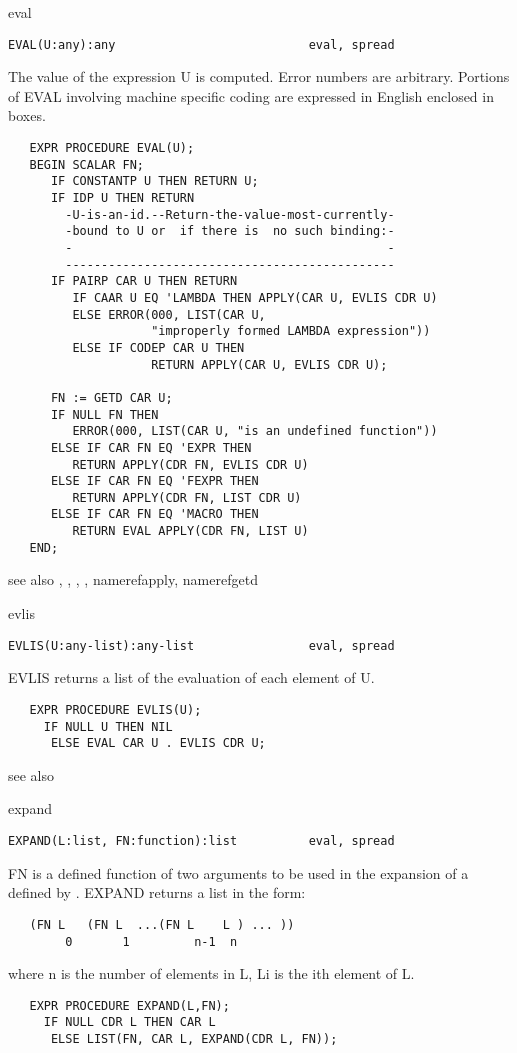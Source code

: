 \begin{Function}{eval}
\begin{verbatim}
EVAL(U:any):any                           eval, spread
\end{verbatim}
   The  value of  the expression  U is  computed.   Error numbers
   are  arbitrary.   Portions of EVAL  involving machine specific
   coding are expressed in English enclosed in boxes.
\begin{verbatim}
   EXPR PROCEDURE EVAL(U);
   BEGIN SCALAR FN;
      IF CONSTANTP U THEN RETURN U;
      IF IDP U THEN RETURN
        -U-is-an-id.--Return-the-value-most-currently-
        -bound to U or  if there is  no such binding:-
        -                                            -
        ----------------------------------------------
      IF PAIRP CAR U THEN RETURN
         IF CAAR U EQ 'LAMBDA THEN APPLY(CAR U, EVLIS CDR U)
         ELSE ERROR(000, LIST(CAR U,
                    "improperly formed LAMBDA expression"))
         ELSE IF CODEP CAR U THEN
                    RETURN APPLY(CAR U, EVLIS CDR U);

      FN := GETD CAR U;
      IF NULL FN THEN
         ERROR(000, LIST(CAR U, "is an undefined function"))
      ELSE IF CAR FN EQ 'EXPR THEN
         RETURN APPLY(CDR FN, EVLIS CDR U)
      ELSE IF CAR FN EQ 'FEXPR THEN
         RETURN APPLY(CDR FN, LIST CDR U)
      ELSE IF CAR FN EQ 'MACRO THEN
         RETURN EVAL APPLY(CDR FN, LIST U)
   END;
\end{verbatim}
see also , , ,
, nameref{apply}, nameref{getd}
\end{Function}
\begin{Function}{evlis}
\begin{verbatim}
EVLIS(U:any-list):any-list                eval, spread
\end{verbatim}
   EVLIS returns a list of the evaluation of each element of U.
\begin{verbatim}
   EXPR PROCEDURE EVLIS(U);
     IF NULL U THEN NIL
      ELSE EVAL CAR U . EVLIS CDR U;
\end{verbatim}
see also 
\end{Function}
\begin{Function}{expand}
\begin{verbatim}
EXPAND(L:list, FN:function):list          eval, spread
\end{verbatim}
   FN  is a defined function  of two arguments to  be used in the
   expansion of a  defined by . EXPAND returns a list in the form:
\begin{verbatim}
   (FN L   (FN L  ...(FN L    L ) ... ))
        0       1         n-1  n
\end{verbatim}
   where  n is the number of elements in L, Li  is the ith element
   of L.
\begin{verbatim}
   EXPR PROCEDURE EXPAND(L,FN);
     IF NULL CDR L THEN CAR L
      ELSE LIST(FN, CAR L, EXPAND(CDR L, FN));
\end{verbatim}
\end{Function}

